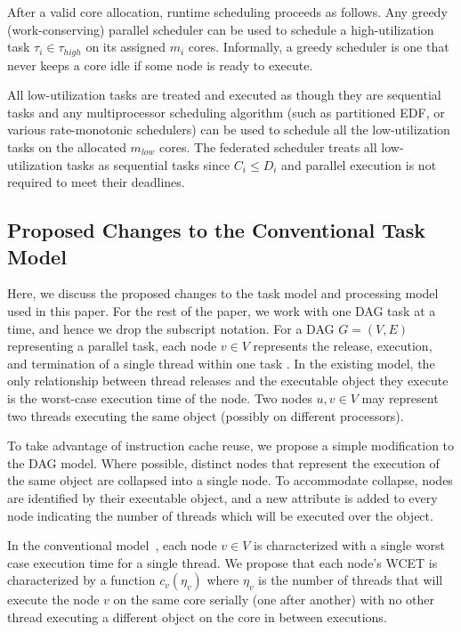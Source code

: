 After a valid core allocation, runtime scheduling proceeds as
follows. Any greedy (work-conserving) parallel scheduler can be used
to schedule a high-utilization task $\tau_{i} \in \tau_{high}$ on its
assigned $m_{i}$ cores. Informally, a greedy scheduler is one that never
keeps a core idle if some node is ready to execute. 

All low-utilization tasks are treated and executed as though they are
sequential tasks and any multiprocessor scheduling algorithm (such as
partitioned EDF, or various rate-monotonic schedulers) can be used to
schedule all the low-utilization tasks on the allocated $m_{low}$
cores. The federated scheduler treats all low-utilization tasks as sequential tasks
since $C_{i} \le D_{i}$ and parallel execution is not required to meet their
deadlines. 

\subsection{Proposed Changes to the Conventional Task Model}
Here, we discuss the proposed changes to the task model and processing model used in this paper.
For the rest of the paper, we work with one DAG task at a time, and hence we drop the subscript notation.
For a DAG ${G = (V, E)}$ representing a parallel task, each node ${v \in V}$ represents
the release, execution, and termination of a single thread within one task 
\cite{li2014analysis}. In the existing model, the only relationship between thread releases and the executable object they execute is the worst-case execution time of the node. Two nodes ${u, v \in V}$ may represent two threads executing the same object (possibly on different processors).

To take advantage of instruction cache reuse, we propose a simple modification to the DAG
model. Where possible, distinct nodes that represent the execution of
the same object are collapsed into a single node. To accommodate collapse,
nodes are identified by their executable object, and a new attribute is added to every node
indicating the number of threads which will be executed over the object.

In the conventional model~\cite{li2014analysis}, each node ${v \in V}$ is characterized
with a single worst case execution time for a single thread. We
propose that each node's WCET is characterized by a function
${c_{v}(\eta_{v})}$ where $\eta_{v}$ is the number of threads that will execute the
node ${v}$ on the same core serially (one after another) with no
other thread executing a different object on the core in between executions.

